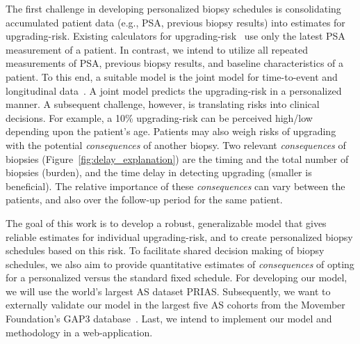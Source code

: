 The first challenge in developing personalized biopsy schedules is consolidating accumulated patient data (e.g., PSA, previous biopsy results) into estimates for upgrading-risk. Existing calculators for upgrading-risk~\citep{partin1993use,makarov2007updated} use only the latest PSA measurement of a patient. In contrast, we intend to utilize all repeated measurements of PSA, previous biopsy results, and baseline characteristics of a patient. To this end, a suitable model is the joint model for time-to-event and longitudinal data~\citep{tomer2019, coley2017prediction,rizopoulos2012joint}. A joint model predicts the upgrading-risk in a personalized manner. A subsequent challenge, however, is translating risks into clinical decisions. For example, a 10\% upgrading-risk can be perceived high/low depending upon the patient's age. Patients may also weigh risks of upgrading with the potential \textit{consequences} of another biopsy. Two relevant \textit{consequences} of biopsies (Figure~\ref{fig:delay_explanation}) are the timing and the total number of biopsies (burden), and the time delay in detecting upgrading (smaller is beneficial). The relative importance of these \textit{consequences} can vary between the patients, and also over the follow-up period for the same patient.

The goal of this work is to develop a robust, generalizable model that gives reliable estimates for individual upgrading-risk, and to create personalized biopsy schedules based on this risk. To facilitate shared decision making of biopsy schedules, we also aim to provide quantitative estimates of \textit{consequences} of opting for a personalized versus the standard fixed schedule. For developing our model, we will use the world's largest AS dataset PRIAS. Subsequently, we want to externally validate our model in the largest five AS cohorts from the Movember Foundation's GAP3 database~\citep{gap3_2018}. Last, we intend to implement our model and methodology in a web-application.